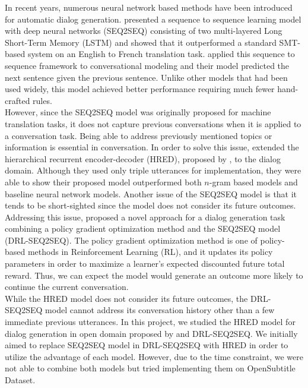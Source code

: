 In recent years, numerous neural network based methods have been introduced for automatic dialog generation. \cite{Sutskever} presented a sequence to sequence learning model with deep neural networks (SEQ2SEQ) consisting of two multi-layered Long Short-Term Memory (LSTM) and showed that it outperformed a standard SMT-based system on an English to French translation task. \cite{Vinyals} applied this sequence to sequence framework to conversational modeling and their model predicted the next sentence given the previous sentence. Unlike other models that had been used widely, this model achieved better performance requiring much fewer hand-crafted rules. \\
However, since the SEQ2SEQ model was originally proposed for machine translation tasks, it does not capture previous conversations when it is applied to a conversation task. Being able to address previously mentioned topics or information is essential in conversation. In order to solve this issue, \cite{Serban} extended the hierarchical recurrent encoder-decoder (HRED), proposed by \cite{Sordoni}, to the dialog domain. Although they used only triple utterances for implementation, they were able to show their proposed model outperformed both $n$-gram based models and baseline neural network models. Another issue of the SEQ2SEQ model is that it tends to be short-sighted since the model does not consider its future outcomes. Addressing this issue, \cite{Li} proposed a novel approach for a dialog generation task combining a policy gradient optimization method and the SEQ2SEQ model (DRL-SEQ2SEQ). The policy gradient optimization method is one of policy-based methods in Reinforcement Learning (RL), and it updates its policy parameters in order to maximize a learner's expected discounted future total reward. Thus, we can expect the model would generate an outcome more likely to continue the current conversation. \\
While the HRED model does not consider its future outcomes, the DRL-SEQ2SEQ model cannot address its conversation history other than a few immediate previous utterances. In this project, we studied the HRED model for dialog generation in open domain proposed by \cite{Serban} and DRL-SEQ2SEQ. We initially aimed to replace SEQ2SEQ model in DRL-SEQ2SEQ with HRED in order to utilize the advantage of each model. However, due to the time constraint, we were not able to combine both models but tried implementing them on OpenSubtitle Dataset. 
